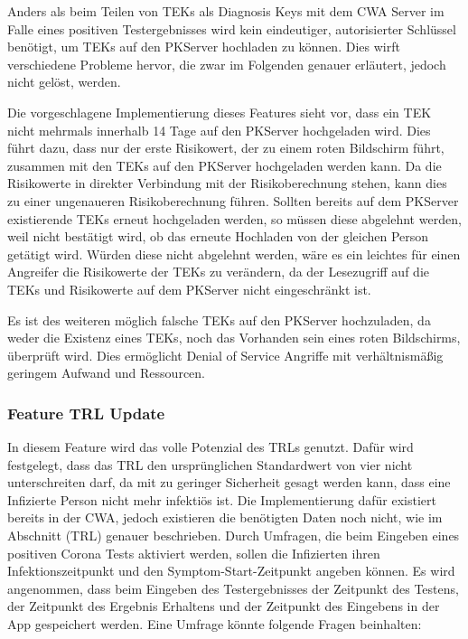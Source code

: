 \documentclass[conference]{IEEEtran}
\begin{document}
Anders als beim Teilen von TEKs als Diagnosis Keys mit dem CWA Server im Falle eines positiven Testergebnisses wird kein eindeutiger, autorisierter Schlüssel benötigt, um TEKs auf den PKServer hochladen zu können.
Dies wirft verschiedene Probleme hervor, die zwar im Folgenden genauer erläutert, jedoch nicht gelöst, werden.

Die vorgeschlagene Implementierung dieses Features sieht vor, dass ein TEK nicht mehrmals innerhalb 14 Tage auf den PKServer hochgeladen wird.
Dies führt dazu, dass nur der erste Risikowert, der zu einem roten Bildschirm führt, zusammen mit den TEKs auf den PKServer hochgeladen werden kann.
Da die Risikowerte in direkter Verbindung mit der Risikoberechnung stehen, kann dies zu einer ungenaueren Risikoberechnung führen.
Sollten bereits auf dem PKServer existierende TEKs erneut hochgeladen werden, so müssen diese abgelehnt werden, weil nicht bestätigt wird, ob das erneute Hochladen von der gleichen Person getätigt wird.
Würden diese nicht abgelehnt werden, wäre es ein leichtes für einen Angreifer die Risikowerte der TEKs zu verändern, da der Lesezugriff auf die TEKs und Risikowerte auf dem PKServer nicht eingeschränkt ist.


Es ist des weiteren möglich falsche TEKs auf den PKServer hochzuladen, da weder die Existenz eines TEKs, noch das Vorhanden sein eines roten Bildschirms, überprüft wird.
Dies ermöglicht Denial of Service Angriffe mit verhältnismäßig geringem Aufwand und Ressourcen.\\


\subsubsection{Feature TRL Update}
In diesem Feature wird das volle Potenzial des TRLs genutzt. Dafür wird festgelegt, dass das TRL den ursprünglichen Standardwert von vier nicht unterschreiten darf, da mit zu geringer Sicherheit gesagt werden kann, dass eine Infizierte Person nicht mehr infektiös ist. Die Implementierung dafür existiert bereits in der CWA, jedoch existieren die benötigten Daten noch nicht, wie im Abschnitt (TRL) genauer beschrieben. Durch Umfragen, die beim Eingeben eines positiven Corona Tests aktiviert werden, sollen die Infizierten ihren Infektionszeitpunkt und den Symptom-Start-Zeitpunkt angeben können. Es wird angenommen, dass beim Eingeben des Testergebnisses der Zeitpunkt des Testens, der Zeitpunkt des Ergebnis Erhaltens und der Zeitpunkt des Eingebens in der App gespeichert werden. Eine Umfrage könnte folgende Fragen beinhalten:
\end{document}
